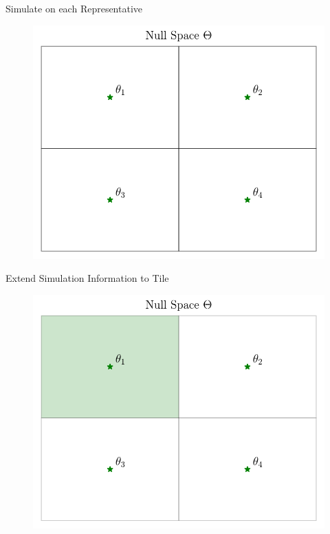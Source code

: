 \begin{frame}{Simulate on each Representative}
\begin{figure}
    \centering
    \includegraphics[width=0.95\linewidth]{figs/approach_3.pdf}
\end{figure} 
\end{frame}

\begin{frame}{Extend Simulation Information to Tile}
\begin{figure}
    \centering
    \includegraphics[width=0.95\linewidth]{figs/approach_4.pdf}
\end{figure} 
\end{frame}

